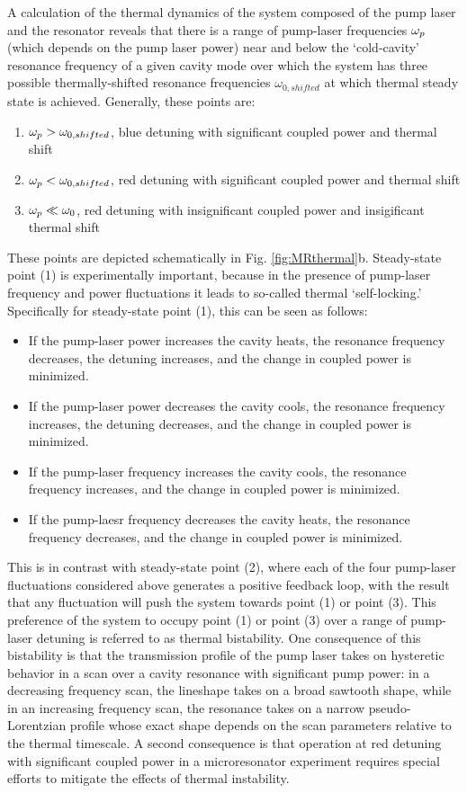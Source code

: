 A calculation of the thermal dynamics of the system \cite{Carmon2004} composed of the pump laser and the resonator reveals that there is a range of pump-laser frequencies $\omega_{p}$ (which depends on the pump laser power) near and below the `cold-cavity' resonance frequency of a given cavity mode over which the system has three possible thermally-shifted resonance frequencies $\omega_{0,shifted}$ at which thermal steady state is achieved. Generally, these points are:
\begin{enumerate}
\item $\omega_{p}>\omega_{0,shifted}$, blue detuning with significant coupled power and thermal shift
\item $\omega_{p}<\omega_{0,shifted}$, red detuning with significant coupled power and thermal shift
\item $\omega_{p}\ll\omega_{0}$, red detuning with insignificant coupled power and insigificant thermal shift
\end{enumerate}
These points are depicted schematically in Fig. \ref{fig:MRthermal}b. Steady-state point (1) is experimentally important, because in the presence of pump-laser frequency and power fluctuations it leads to so-called thermal `self-locking.' Specifically for steady-state point (1), this can be seen as follows: 
\begin{itemize}
	\item If the pump-laser power increases the cavity heats, the resonance frequency decreases, the detuning increases, and the change in coupled power is minimized.
	\item If the pump-laser power decreases the cavity cools, the resonance frequency increases, the detuning decreases, and the change in coupled power is minimized.
	\item If the pump-laser frequency increases the cavity cools, the resonance frequency increases, and the change in coupled power is minimized.
	\item If the pump-laesr frequency decreases the cavity heats, the resonance frequency decreases, and the change in coupled power is minimized.
	\end{itemize}
This is in contrast with steady-state point (2), where each of the four pump-laser fluctuations considered above generates a positive feedback loop, with the result that any fluctuation will push the system towards point (1) or point (3). This preference of the system to occupy point (1) or point (3) over a range of pump-laser detuning is referred to as thermal bistability. One consequence of this bistability is that the transmission profile of the pump laser takes on hysteretic behavior in a scan over a cavity resonance with significant pump power: in a decreasing frequency scan, the lineshape takes on a broad sawtooth shape, while in an increasing frequency scan, the resonance takes on a narrow pseudo-Lorentzian profile whose exact shape depends on the scan parameters relative to the thermal timescale. \color{red}A second consequence is that operation at red detuning with significant coupled power in a microresonator experiment requires special efforts to mitigate the effects of thermal instability.\color{black}

